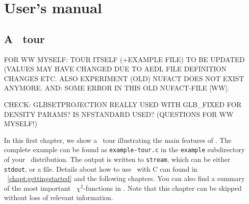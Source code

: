 
\part{User's manual}
\label{part:1}

\chapter{A \GLOBES\ tour}
\label{chapter:tour}

FOR WW MYSELF: TOUR ITSELF (+EXAMPLE FILE) TO BE UPDATED (VALUES MAY HAVE CHANGED DUE TO AEDL FILE DEFINITION
CHANGES ETC. ALSO EXPERIMENT (OLD) NUFACT DOES NOT EXIST ANYMORE. AND: SOME ERROR IN THIS OLD
NUFACT-FILE [WW].

CHECK: GLBSETPROJECTION REALLY USED WITH GLB\_FIXED FOR DENSITY PARAMS? IS NFSTANDARD USED?
(QUESTIONS FOR WW MYSELF!)

In this first chapter, we show a \GLOBES\ tour illustrating the
main features of \GLOBES . The complete example  
can be found as {\tt example-tour.c} in the \verb+example+ subdirectory 
of your \GLOBES\ distribution.
The output is written to {\tt stream}, which can be either {\tt stdout},
or a file. Details about how to use \GLOBES\ with C can found in \Chapt~\ref{chapt:gettingstarted} and the following chapters.
You can also find a summary of the most important \GLOBES\ $\chi^2$-functions in . Note that this chapter
can be skipped without loss of relevant information.

